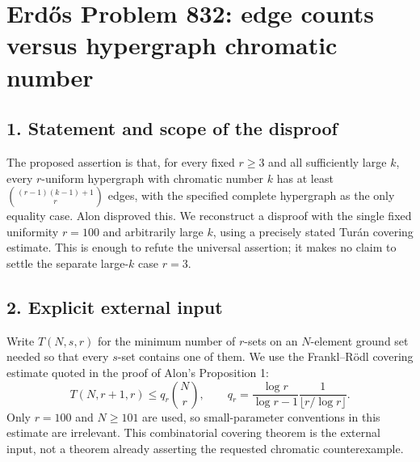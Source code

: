 \section*{Erd\H{o}s Problem 832: edge counts versus hypergraph chromatic number}
\subsection*{1. Statement and scope of the disproof}
The proposed assertion is that, for every fixed $r\ge3$ and all sufficiently large $k$, every $r$-uniform hypergraph with chromatic number $k$ has at least $\binom{(r-1)(k-1)+1}{r}$ edges, with the specified complete hypergraph as the only equality case. Alon disproved this. We reconstruct a disproof with the single fixed uniformity $r=100$ and arbitrarily large $k$, using a precisely stated Tur\'an covering estimate. This is enough to refute the universal assertion; it makes no claim to settle the separate large-$k$ case $r=3$.
\subsection*{2. Explicit external input}
Write $T(N,s,r)$ for the minimum number of $r$-sets on an $N$-element ground set needed so that every $s$-set contains one of them. We use the Frankl--R\"odl covering estimate quoted in the proof of Alon's Proposition 1:
\[
 T(N,r+1,r)\le q_r\binom Nr,\qquad
 q_r=\frac{\log r}{\log r-1}\frac1{\lfloor r/\log r\rfloor}.       \tag{1}
\]
Only $r=100$ and $N\ge101$ are used, so small-parameter conventions in this estimate are irrelevant. This combinatorial covering theorem is the external input, not a theorem already asserting the requested chromatic counterexample.
